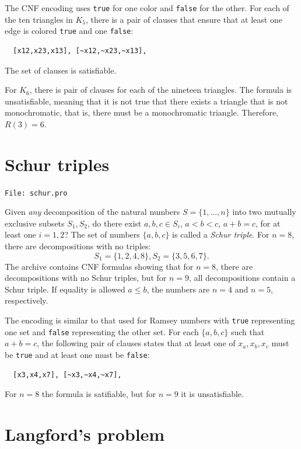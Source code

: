 \documentclass[11pt]{report}
\newcommand*{\p}[1]{\textup{\texttt{#1}}}
\newcommand*{\fl}[1]{\parbox{\textwidth}{\raggedleft \p{File: #1}}}
\begin{document}
The CNF encoding uses \p{true} for one color and \p{false} for the other. For each of the ten triangles in $K_5$, there is a pair of clauses that ensure that at least one edge is colored \p{true} and one \p{false}:
\begin{verbatim}
  [x12,x23,x13], [~x12,~x23,~x13],
\end{verbatim}
The set of clauses is satisfiable.

For $K_6$, there is pair of clauses for each of the nineteen triangles. The formula is unsatisfiable, meaning that it is not true that there exists a triangle that is not monochromatic, that is, there must be a monochromatic triangle. Therefore, $R(3) = 6$.
	

\section{Schur triples}

\fl{schur.pro}

Given \emph{any} decomposition of the natural numbers $S=\{1,\ldots,n\}$ into two mutually exclusive subsets $S_1,S_2$, do there exist $a,b,c\in S_i$, $a<b<c$, $a+b=c$, for at least one $i=1,2$? The set of numbers $\{a,b,c\}$ is called a \emph{Schur triple}. For $n=8$, there are decompositions with no triples:
\[
S_1 = \{1,2,4,8\}, S_2 = \{3,5,6,7\}.
\]
The archive contains CNF formulas showing that for $n=8$, there are decompositions with no Schur triples, but for $n=9$, all decompositions contain a Schur triple. If equality is allowed $a\leq b$, the numbers are $n=4$ and $n=5$, respectively.

The encoding is similar to that used for Ramsey numbers with \p{true} representing one set and \p{false} representing the other set. For each $\{a,b,c\}$ such that $a+b=c$, the following pair of clauses states that at least one of $x_a,x_b,x_c$ must be \p{true} and at least one must be \p{false}:
\begin{verbatim}
  [x3,x4,x7], [~x3,~x4,~x7],
\end{verbatim}
For $n=8$ the formula is satifiable, but for $n=9$ it is unsatisfiable.


\section{Langford's problem}
\end{document}
